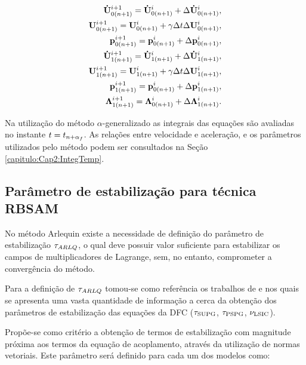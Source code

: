 \documentclass[tese_patricia]{subfiles}
\begin{document}
\begin{align}
	\mathbf{\dot{U}}_{0(n+1)}^{i+1} = \mathbf{\dot{U}}_{0(n+1)}^{i} + \Delta\mathbf{\dot{U}}_{0(n+1)}^{i}, \label{eq:atu_acel_0} \\ 
	\mathbf{U}_{0(n+1)}^{i+1} = \mathbf{U}_{0(n+1)}^{i} + \gamma \Delta t \Delta\mathbf{U}_{0(n+1)}^{i},\label{eq:atu_vel_0}\\
	\mathbf{p}_{0(n+1)}^{i+1} = \mathbf{p}_{0(n+1)}^{i} + \Delta\mathbf{p}_{0(n+1)}^{i}, \label{eq:atu_press_0} \\
	\mathbf{\dot{U}}_{1(n+1)}^{i+1} = \mathbf{\dot{U}}_{1(n+1)}^{i} + \Delta\mathbf{\dot{U}}_{1(n+1)}^{i}, \label{eq:atu_acel_1} \\ 
	\mathbf{U}_{1(n+1)}^{i+1} = \mathbf{U}_{1(n+1)}^{i} + \gamma \Delta t \Delta\mathbf{U}_{1(n+1)}^{i},\label{eq:atu_vel_1}\\
	\mathbf{p}_{1(n+1)}^{i+1} = \mathbf{p}_{0(n+1)}^{i} + \Delta\mathbf{p}_{1(n+1)}^{i}, \label{eq:atu_press_1} \\
	\boldsymbol{\Lambda}_{1(n+1)}^{i+1} = \boldsymbol{\Lambda}_{0(n+1)}^{i} + \Delta\boldsymbol{\Lambda}_{1(n+1)}^{i}. \label{eq:atu_lag_mult}
\end{align}

Na utilização do método $\alpha$-generalizado as integrais das equações são avaliadas no instante $t = t_{n+\alpha_f}$. As relações entre velocidade e aceleração, e os parâmetros utilizados pelo método podem ser consultados na Seção \ref{capitulo:Cap2:IntegTemp}.


\subsection{Parâmetro de estabilização para técnica RBSAM}

No método Arlequin existe a necessidade de definição do parâmetro de estabilização $\tau_{ARLQ}$, o qual deve possuir valor suficiente para estabilizar os campos de multiplicadores de Lagrange, sem, no entanto, comprometer a convergência do método. 

Para a definição de $\tau_{ARLQ}$ tomou-se como referência os trabalhos de  e  nos quais se apresenta uma vasta quantidade de informação a cerca da obtenção dos parâmetros de estabilização das equações da DFC ($\tau_{\mathrm{SUPG}}$, $\tau_{\mathrm{PSPG}}$, $\nu_{\mathrm{LSIC}}$). 
 
Propõe-se como critério a obtenção de termos de estabilização com magnitude próxima aos termos da equação de acoplamento, através da utilização de normas vetoriais. Este parâmetro será definido para cada um dos modelos como:
\end{document}
